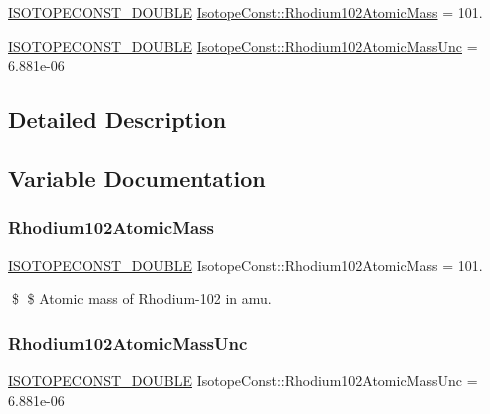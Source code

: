 \begin{DoxyCompactItemize}
\item 
\mbox{\hyperlink{group___isotope_const-_macros_ga8f45a7272ce02c0b4c65c44636ed719a}{I\+S\+O\+T\+O\+P\+E\+C\+O\+N\+S\+T\+\_\+\+D\+O\+U\+B\+LE}} \mbox{\hyperlink{group___isotope_const-_rhodium-_rh102_gadb20b760b6fe5913302f46088a1021b9}{Isotope\+Const\+::\+Rhodium102\+Atomic\+Mass}} = 101.
\item 
\mbox{\hyperlink{group___isotope_const-_macros_ga8f45a7272ce02c0b4c65c44636ed719a}{I\+S\+O\+T\+O\+P\+E\+C\+O\+N\+S\+T\+\_\+\+D\+O\+U\+B\+LE}} \mbox{\hyperlink{group___isotope_const-_rhodium-_rh102_ga09094629aef8e5bfe60fb80df1c39459}{Isotope\+Const\+::\+Rhodium102\+Atomic\+Mass\+Unc}} = 6.\+881e-\/06
\end{DoxyCompactItemize}


\subsection{Detailed Description}


\subsection{Variable Documentation}
\mbox{\label{group___isotope_const-_rhodium-_rh102_gadb20b760b6fe5913302f46088a1021b9}} 
\subsubsection{\texorpdfstring{Rhodium102\+Atomic\+Mass}{Rhodium102AtomicMass}}
{\footnotesize\ttfamily \mbox{\hyperlink{group___isotope_const-_macros_ga8f45a7272ce02c0b4c65c44636ed719a}{I\+S\+O\+T\+O\+P\+E\+C\+O\+N\+S\+T\+\_\+\+D\+O\+U\+B\+LE}} Isotope\+Const\+::\+Rhodium102\+Atomic\+Mass = 101.}

\$ \$ Atomic mass of Rhodium-\/102 in amu. \mbox{\label{group___isotope_const-_rhodium-_rh102_ga09094629aef8e5bfe60fb80df1c39459}} 
\subsubsection{\texorpdfstring{Rhodium102\+Atomic\+Mass\+Unc}{Rhodium102AtomicMassUnc}}
{\footnotesize\ttfamily \mbox{\hyperlink{group___isotope_const-_macros_ga8f45a7272ce02c0b4c65c44636ed719a}{I\+S\+O\+T\+O\+P\+E\+C\+O\+N\+S\+T\+\_\+\+D\+O\+U\+B\+LE}} Isotope\+Const\+::\+Rhodium102\+Atomic\+Mass\+Unc = 6.\+881e-\/06}

